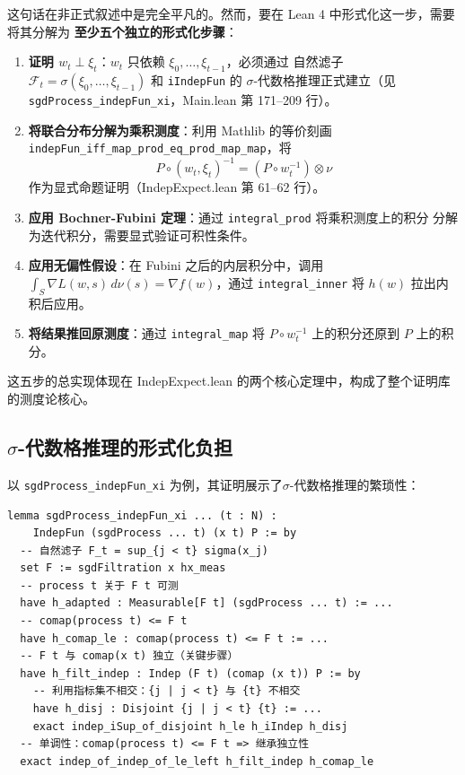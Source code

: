 \documentclass[12pt, a4paper]{article}
\newcommand{\lean}[1]{\texttt{#1}}
\begin{document}
这句话在非正式叙述中是完全平凡的。然而，要在 Lean 4 中形式化这一步，需要将其分解为
\textbf{至少五个独立的形式化步骤}：

\begin{enumerate}
  \item \textbf{证明 $w_t \perp \xi_t$}：$w_t$ 只依赖 $\xi_0,\ldots,\xi_{t-1}$，必须通过
        自然滤子 $\mathcal{F}_t = \sigma(\xi_0,\ldots,\xi_{t-1})$ 和 \lean{iIndepFun} 的
        $\sigma$-代数格推理正式建立（见 \lean{sgdProcess\_indepFun\_xi}，Main.lean 第 171--209 行）。

  \item \textbf{将联合分布分解为乘积测度}：利用 Mathlib 的等价刻画
        \lean{indepFun\_iff\_map\_prod\_eq\_prod\_map\_map}，将
        \[
          P \circ (w_t, \xi_t)^{-1} = (P \circ w_t^{-1}) \otimes \nu
        \]
        作为显式命题证明（IndepExpect.lean 第 61--62 行）。

  \item \textbf{应用 Bochner-Fubini 定理}：通过 \lean{integral\_prod} 将乘积测度上的积分
        分解为迭代积分，需要显式验证可积性条件。

  \item \textbf{应用无偏性假设}：在 Fubini 之后的内层积分中，调用
        $\int_S \nabla L(w, s)\, d\nu(s) = \nabla f(w)$，通过 \lean{integral\_inner} 将
        $h(w)$ 拉出内积后应用。

  \item \textbf{将结果推回原测度}：通过 \lean{integral\_map} 将
        $P \circ w_t^{-1}$ 上的积分还原到 $P$ 上的积分。
\end{enumerate}

这五步的总实现体现在 IndepExpect.lean 的两个核心定理中，构成了整个证明库的测度论核心。

\subsection{$\sigma$-代数格推理的形式化负担}

以 \lean{sgdProcess\_indepFun\_xi} 为例，其证明展示了$\sigma$-代数格推理的繁琐性：

\begin{lstlisting}
lemma sgdProcess_indepFun_xi ... (t : N) :
    IndepFun (sgdProcess ... t) (x t) P := by
  -- 自然滤子 F_t = sup_{j < t} sigma(x_j)
  set F := sgdFiltration x hx_meas
  -- process t 关于 F t 可测
  have h_adapted : Measurable[F t] (sgdProcess ... t) := ...
  -- comap(process t) <= F t
  have h_comap_le : comap(process t) <= F t := ...
  -- F t 与 comap(x t) 独立（关键步骤）
  have h_filt_indep : Indep (F t) (comap (x t)) P := by
    -- 利用指标集不相交：{j | j < t} 与 {t} 不相交
    have h_disj : Disjoint {j | j < t} {t} := ...
    exact indep_iSup_of_disjoint h_le h_iIndep h_disj
  -- 单调性：comap(process t) <= F t => 继承独立性
  exact indep_of_indep_of_le_left h_filt_indep h_comap_le
\end{lstlisting}
\end{document}
